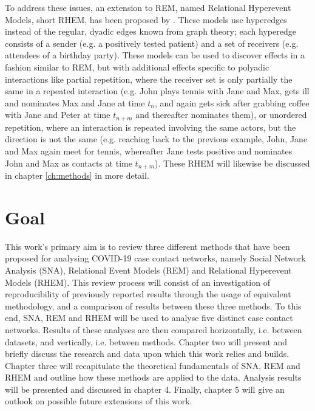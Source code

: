 To address these issues, an extension to REM, named Relational Hyperevent Models, short RHEM, has been proposed by \cite{lerner2019rem}. These models use hyperedges instead of the regular, dyadic edges known from graph theory; each hyperedge consists of a sender (e.g. a positively tested patient) and a set of receivers (e.g. attendees of a birthday party). These models can be used to discover effects in a fashion similar to REM, but with additional effects specific to polyadic interactions like partial repetition, where the receiver set is only partially the same in a repeated interaction (e.g. John plays tennis with Jane and Max, gets ill and nominates Max and Jane at time $t_n$, and again gets sick after grabbing coffee with Jane and Peter at time $t_{n+m}$ and thereafter nominates them), or unordered repetition, where an interaction is repeated involving the same actors, but the direction is not the same (e.g. reaching back to the previous example, John, Jane and Max again meet for tennis, whereafter Jane tests positive and nominates John and Max as contacts at time $t_{n+m}$). These RHEM will likewise be discussed in chapter \ref{ch:methods} in more detail.

\section{Goal}
\label{sec:intro_goal}

This work's primary aim is to review three different methods that have been proposed for analysing COVID-19 case contact networks, namely Social Network Analysis (SNA), Relational Event Models (REM) and Relational Hyperevent Models (RHEM). This review process will consist of an investigation of reproducibility of previously reported results through the usage of equivalent methodology, and a comparison of results between these three methods. To this end, SNA, REM and RHEM will be used to analyse five distinct case contact networks. Results of these analyses are then compared horizontally, i.e. between datasets, and vertically, i.e. between methods. Chapter two will present and briefly discuss the research and data upon which this work relies and builds. Chapter three will recapitulate the theoretical fundamentals of SNA, REM and RHEM and outline how these methods are applied to the data. Analysis results will be presented and discussed in chapter 4. Finally, chapter 5 will give an outlook on possible future extensions of this work.